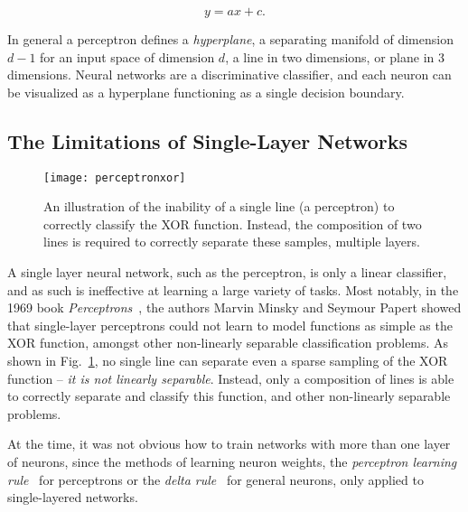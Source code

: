 \documentclass[thesis]{subfiles}
\begin{document}
\begin{equation}
y = a x + c.
\end{equation}

In general a perceptron defines a \emph{hyperplane}, a separating manifold of dimension $d - 1$ for an input space of dimension $d$, a line in two dimensions, or plane in 3 dimensions. Neural networks are a discriminative classifier, and each neuron can be visualized as a hyperplane functioning as a single decision boundary.

\subsection{The Limitations of Single-Layer Networks}
\begin{figure}[tbp]
\centering
\texttt{[image: perceptronxor]}
\caption[An illustration of the inability of a single line to correctly classify the XOR function]{An illustration of the inability of a single line (\ie a perceptron) to correctly classify the XOR function. Instead, the composition of two lines is required to correctly separate these samples, \ie multiple layers.}
\label{fig:perceptronxor}
\end{figure}
A single layer neural network, such as the perceptron, is only a linear classifier, and as such is ineffective at learning a large variety of tasks. Most notably, in the 1969 book \emph{Perceptrons}~\citep{minsky1988perceptrons}, the authors Marvin Minsky and Seymour Papert showed that single-layer perceptrons could not learn to model functions as simple as the XOR function, amongst other non-linearly separable classification problems. As shown in Fig.~\ref{fig:perceptronxor}, no single line can separate even a sparse sampling of the XOR function -- \ie \emph{it is not linearly separable}. Instead, only a composition of lines is able to correctly separate and classify this function, and other non-linearly separable problems.

At the time, it was not obvious how to train networks with more than one layer of neurons, since the methods of learning neuron weights, the \emph{perceptron learning rule}~\citep{rosenblatt1961principles} for perceptrons or the \emph{delta rule}~\citep{widrow1960adaptive} for general neurons, only applied to single-layered networks. %
\end{document}
